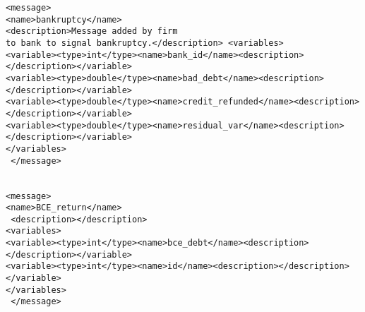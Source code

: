 \begin{mylisting}
\begin{verbatim}
<message> 
<name>bankruptcy</name> 
<description>Message added by firm
to bank to signal bankruptcy.</description> <variables>
<variable><type>int</type><name>bank_id</name><description></description></variable>
<variable><type>double</type><name>bad_debt</name><description></description></variable>
<variable><type>double</type><name>credit_refunded</name><description></description></variable>
<variable><type>double</type><name>residual_var</name><description></description></variable>
</variables>
 </message>


<message> 
<name>BCE_return</name>
 <description></description>
<variables>
<variable><type>int</type><name>bce_debt</name><description></description></variable>
<variable><type>int</type><name>id</name><description></description></variable>
</variables>
 </message>
\end{verbatim}
\end{mylisting}
